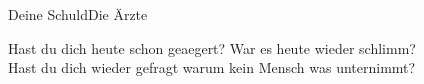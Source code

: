 \begin{song}{Deine Schuld}{Die Ärzte}
    Hast du dich heute schon geaegert? War es heute wieder schlimm? \\
    Hast du dich wieder gefragt warum kein Mensch was unternimmt? \\
\end{song}
